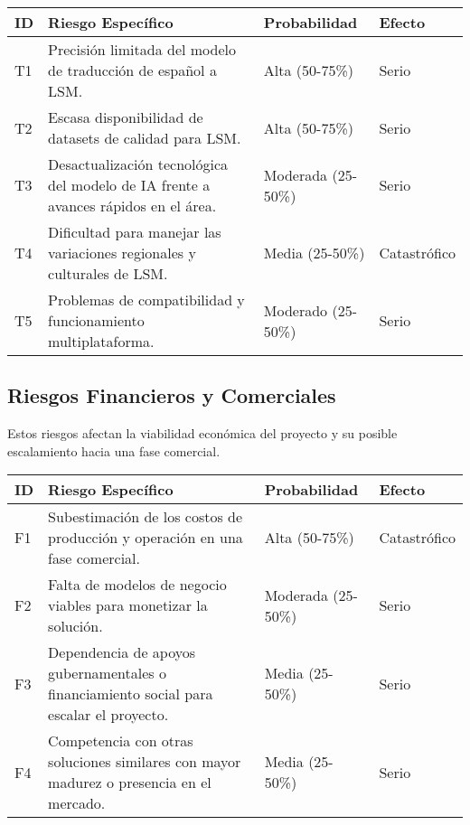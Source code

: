 \begin{longtable}{|>{\centering\arraybackslash}p{1cm}|>{\raggedright\arraybackslash}p{8cm}|>{\centering\arraybackslash}p{3cm}|>{\centering\arraybackslash}p{3cm}|}
	\hline
	\textbf{ID} & \textbf{Riesgo Específico} & \textbf{Probabilidad} & \textbf{Efecto} \\
	\hline
	T1 & Precisión limitada del modelo de traducción de español a LSM. & Alta (50-75\%) & Serio \\
	\hline
	T2 & Escasa disponibilidad de datasets de calidad para LSM. & Alta (50-75\%) & Serio \\
	\hline
	T3 & Desactualización tecnológica del modelo de IA frente a avances rápidos en el área. & Moderada (25-50\%) & Serio \\
	\hline
	T4 & Dificultad para manejar las variaciones regionales y culturales de LSM. & Media (25-50\%) & Catastrófico \\
	\hline
	T5 & Problemas de compatibilidad y funcionamiento multiplataforma. & Moderado (25-50\%) & Serio \\
	\hline
\end{longtable}

\subsection{Riesgos Financieros y Comerciales}
Estos riesgos afectan la viabilidad económica del proyecto y su posible escalamiento hacia una fase comercial.

\begin{longtable}{|>{\centering\arraybackslash}p{1cm}|>{\raggedright\arraybackslash}p{8cm}|>{\centering\arraybackslash}p{3cm}|>{\centering\arraybackslash}p{3cm}|}
	\hline
	\textbf{ID} & \textbf{Riesgo Específico} & \textbf{Probabilidad} & \textbf{Efecto} \\
	\hline
	F1 & Subestimación de los costos de producción y operación en una fase comercial. & Alta (50-75\%) & Catastrófico \\
	\hline
	F2 & Falta de modelos de negocio viables para monetizar la solución. & Moderada (25-50\%) & Serio \\
	\hline
	F3 & Dependencia de apoyos gubernamentales o financiamiento social para escalar el proyecto. & Media (25-50\%) & Serio \\
	\hline
	F4 & Competencia con otras soluciones similares con mayor madurez o presencia en el mercado. & Media (25-50\%) & Serio \\
	\hline
\end{longtable}

